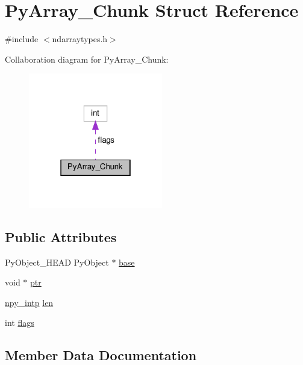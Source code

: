 \hypertarget{structPyArray__Chunk}{}\section{Py\+Array\+\_\+\+Chunk Struct Reference}
\label{structPyArray__Chunk}


{\ttfamily \#include $<$ndarraytypes.\+h$>$}



Collaboration diagram for Py\+Array\+\_\+\+Chunk\+:
\nopagebreak
\begin{figure}[H]
\begin{center}
\leavevmode
\includegraphics[width=166pt]{structPyArray__Chunk__coll__graph}
\end{center}
\end{figure}
\subsection*{Public Attributes}
\begin{DoxyCompactItemize}
\item 
Py\+Object\+\_\+\+H\+E\+AD Py\+Object $\ast$ \hyperlink{structPyArray__Chunk_af3b2320f82c3d03b90f0fec9947e5446}{base}
\item 
void $\ast$ \hyperlink{structPyArray__Chunk_a55119957f0529399a8c61ac19b500769}{ptr}
\item 
\hyperlink{npy__common_8h_a2d6effc4d5ecb85675ebfcfaa102b483}{npy\+\_\+intp} \hyperlink{structPyArray__Chunk_abb6db82c88df0ddfcdbd2d947833e7ec}{len}
\item 
int \hyperlink{structPyArray__Chunk_a4dac1d595913af0e2193bf1e93e960cb}{flags}
\end{DoxyCompactItemize}


\subsection{Member Data Documentation}
\mbox{\label{structPyArray__Chunk_af3b2320f82c3d03b90f0fec9947e5446}} 
